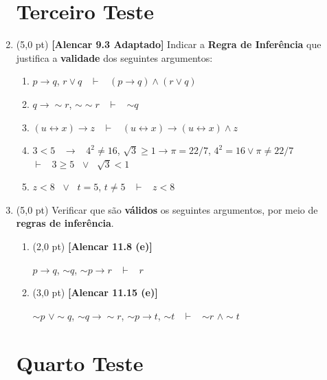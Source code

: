 \documentclass[12pt,a4paper,oneside]{article}
\begin{document}
\begin{enumerate}
	
	\section*{Terceiro Teste}
	
	\item (5,0 pt) {\bf [Alencar 9.3 Adaptado]} Indicar a {\bf Regra de Inferência} que justifica a {\bf validade} dos seguintes argumentos:
	\begin{enumerate}
		\item $p \rightarrow q$, $r \vee q$ \ $\vdash$ \ $(p \rightarrow q) \wedge (r \vee q)$
		\item $q \rightarrow \sim r$, $\sim \sim r$ \ $\vdash$ \ $\sim q$
		\item $(u \leftrightarrow x) \rightarrow z$ \ $\vdash$ \ $(u \leftrightarrow x) \rightarrow (u \leftrightarrow x) \wedge z$
		\item $3 < 5$ \ $\rightarrow$ \ $4^2 \not= 16$, $\sqrt{3} \geq 1 \rightarrow \pi = 22/7$, $4^2 = 16 \vee \pi \not= 22/7$ \ \\$\vdash$ \ $3 \geq 5$ \ $\vee$ \ $\sqrt{3} < 1$
		\item $z < 8$ \ $\vee$ \ $t=5$, $t \not=5$ \ $\vdash$ \ $z <8$
	\end{enumerate}
	
	\item (5,0 pt) Verificar que são {\bf válidos} os seguintes argumentos, por meio de {\bf regras de inferência}.
	\begin{enumerate}
		\item (2,0 pt) {\bf [Alencar 11.8 (e)]}
		\begin{center}
			$p \rightarrow q$, $\sim q$, $\sim p \rightarrow r$ \ $\vdash$ \ $r$
		\end{center}
		
		
		\item (3,0 pt) {\bf [Alencar 11.15 (e)]} 
		\begin{center}
			$\sim p$ $\vee \sim q$, $\sim q \rightarrow \sim r$, $\sim p \rightarrow t$, $\sim t$ 
			\ $\vdash$ \ $\sim r$ $\wedge \sim t$
		\end{center}
		
	\end{enumerate}
	
	\section*{Quarto Teste}
	

\end{enumerate}
\end{document}
